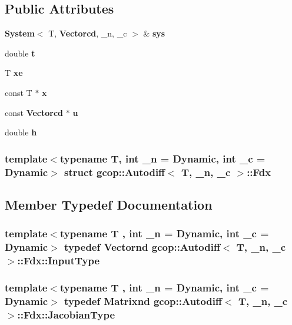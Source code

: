\subsection*{\-Public \-Attributes}
\begin{DoxyCompactItemize}
\item 
{\bf \-System}$<$ \-T, {\bf \-Vectorcd}, \-\_\-n, \-\_\-c $>$ \& {\bf sys}
\item 
double {\bf t}
\item 
\-T {\bf xe}
\item 
const \-T $\ast$ {\bf x}
\item 
const {\bf \-Vectorcd} $\ast$ {\bf u}
\item 
double {\bf h}
\end{DoxyCompactItemize}
\subsubsection*{template$<$typename T, int \-\_\-n = \-Dynamic, int \-\_\-c = \-Dynamic$>$ struct gcop\-::\-Autodiff$<$ T, \-\_\-n, \-\_\-c $>$\-::\-Fdx}



\subsection{\-Member \-Typedef \-Documentation}
\subsubsection[{\-Input\-Type}]{\setlength{\rightskip}{0pt plus 5cm}template$<$typename T , int \-\_\-n = \-Dynamic, int \-\_\-c = \-Dynamic$>$ typedef {\bf \-Vectornd} {\bf gcop\-::\-Autodiff}$<$ \-T, \-\_\-n, \-\_\-c $>$\-::{\bf \-Fdx\-::\-Input\-Type}}\label{structgcop_1_1Autodiff_1_1Fdx_a670506b176026ae7f9fed57e80e712e8}
\subsubsection[{\-Jacobian\-Type}]{\setlength{\rightskip}{0pt plus 5cm}template$<$typename T , int \-\_\-n = \-Dynamic, int \-\_\-c = \-Dynamic$>$ typedef {\bf \-Matrixnd} {\bf gcop\-::\-Autodiff}$<$ \-T, \-\_\-n, \-\_\-c $>$\-::{\bf \-Fdx\-::\-Jacobian\-Type}}\label{structgcop_1_1Autodiff_1_1Fdx_a729fc4130837b874f973335e0a3d3a10}
